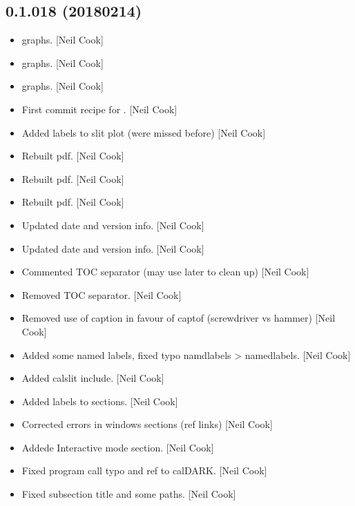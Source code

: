 \documentclass[a4paper,10pt,english]{report}
\begin{document}
\subsection{0.1.018 (2018\sphinxhyphen{}02\sphinxhyphen{}14)}
\label{\detokenize{misc/changelog:id505}}\begin{itemize}
\item {} 
 graphs. {[}Neil Cook{]}

\item {} 
 graphs. {[}Neil Cook{]}

\item {} 
 graphs. {[}Neil Cook{]}

\item {} 
First commit \sphinxhyphen{} recipe for . {[}Neil Cook{]}

\item {} 
Added labels to slit plot (were missed before) {[}Neil Cook{]}

\item {} 
Rebuilt pdf. {[}Neil Cook{]}

\item {} 
Rebuilt pdf. {[}Neil Cook{]}

\item {} 
Rebuilt pdf. {[}Neil Cook{]}

\item {} 
Updated date and version info. {[}Neil Cook{]}

\item {} 
Updated date and version info. {[}Neil Cook{]}

\item {} 
Commented TOC separator (may use later to clean up) {[}Neil Cook{]}

\item {} 
Removed TOC separator. {[}Neil Cook{]}

\item {} 
Removed use of caption in favour of capt\sphinxhyphen{}of (screwdriver vs hammer)
{[}Neil Cook{]}

\item {} 
Added some named labels, fixed typo namdlabels \textendash{}\textgreater{} namedlabels. {[}Neil
Cook{]}

\item {} 
Added calslit include. {[}Neil Cook{]}

\item {} 
Added labels to sections. {[}Neil Cook{]}

\item {} 
Corrected errors in windows sections (ref links) {[}Neil Cook{]}

\item {} 
Addede Interactive mode section. {[}Neil Cook{]}

\item {} 
Fixed program call typo and ref to calDARK. {[}Neil Cook{]}

\item {} 
Fixed subsection title and some paths. {[}Neil Cook{]}

\end{itemize}
\end{document}
